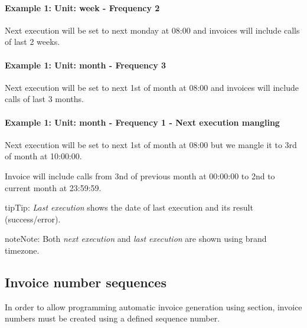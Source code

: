 \documentclass[letterpaper,10pt,english]{sphinxmanual}
\begin{document}
\paragraph{Example 1: Unit: week - Frequency 2}

Next execution will be set to next monday at 08:00 and invoices will include calls of last 2 weeks.
\paragraph{Example 1: Unit: month - Frequency 3}

Next execution will be set to next 1st of month at 08:00 and invoices will include calls of last 3 months.
\paragraph{Example 1: Unit: month - Frequency 1 - Next execution mangling}

Next execution will be set to next 1st of month at 08:00 but we mangle it to 3rd of month at 10:00:00.

Invoice will include calls from 3nd of previous month at 00:00:00 to 2nd to current month at 23:59:59.

\begin{notice}{tip}{Tip:}
\emph{Last execution} shows the date of last execution and its result (success/error).
\end{notice}

\begin{notice}{note}{Note:}
Both \emph{next execution} and \emph{last execution} are shown using brand timezone.
\end{notice}


\subsection{Invoice number sequences}
\label{administration_portal/brand/invoicing/invoice_number_sequences:invoice-number-sequences}\label{administration_portal/brand/invoicing/invoice_number_sequences::doc}
In order to allow programming automatic invoice generation using {\hyperref[administration_portal/brand/invoicing/invoice_schedulers:invoice\string-schedulers]{}} section, invoice
numbers must be created using a defined sequence number.
\end{document}
